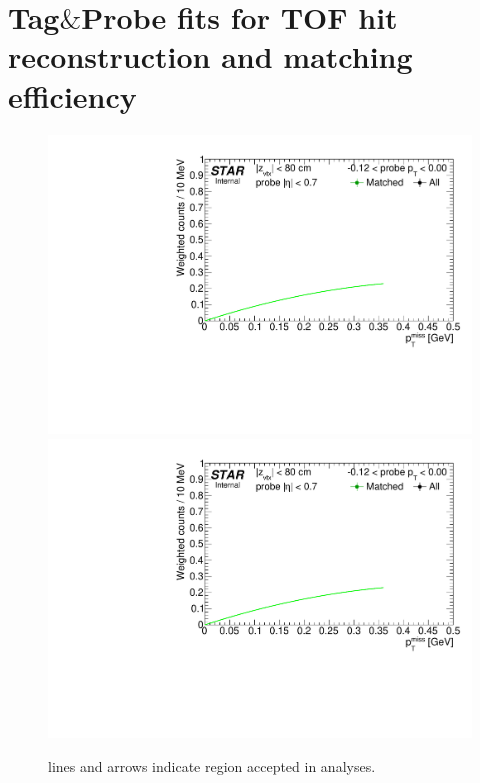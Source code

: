 
\chapter{Tag\texorpdfstring{$\&$}{&}Probe fits for TOF hit reconstruction and matching efficiency}\label{appendix:tagAndProbeTofEff}


\begin{figure}[h!]
\caption[TOF acceptance, reconstruction and matching efficiency of $\pi^{+}$.]{ lines and arrows indicate region accepted in analyses.}\label{fig:tagAndProbeTofEffFits_Pt}
\centering
\parbox{0.495\textwidth}{
  \centering
  \includegraphics[width=\linewidth,page=4]{graphics/systematicsEfficiency/TOF_tagAndProbe/Fitting_effVsPt_data.CPT.pdf}\\
  \includegraphics[width=\linewidth,page=5]{graphics/systematicsEfficiency/TOF_tagAndProbe/Fitting_effVsPt_data.CPT.pdf}\\
}
\end{figure}
